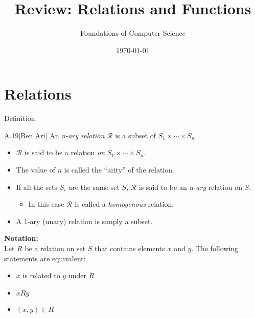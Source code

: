 \documentclass[style=sailor,size=12pt]{powerdot}
\title{Review: Relations and Functions}
\author{Foundations of Computer Science}
\date{\today}
\begin{document}
\maketitle
\section[slide=true]{Relations}
\begin{slide}[bm=,toc=]{Definition}
\begin{defn}{A.19}[Ben Ari]
An \emph{n-ary relation} $\mathcal{R}$ is a subset of $S_1 \times \cdots \times
S_n$. 
\begin{itemize}
\item $\mathcal{R}$ is said to be a relation \emph{on} $S_1 \times \cdots \times
S_n$.
\item The value of $n$ is called the ``arity'' of the relation.
\item If all the sets $S_i$ are the same set $S$, $\mathcal{R}$ is said to be
an \emph{n-ary} relation on $S$.
\begin{itemize}
\item In this case $\mathcal{R}$ is called a \emph{homogenous} relation.
\end{itemize}
\item A 1-ary (unary) relation is simply a subset.
\end{itemize}
\end{defn}
\vspace{-3mm}
\textbf{Notation:}~\\
Let $R$ be a relation on set $S$ that contains elements $x$ and $y$. 
The following statements are equivalent: 
\begin{itemize}
\item $x$ is related to $y$ under $R$
\item $xRy$
\item $(x,y) \in R$
\end{itemize}
\end{slide}
\end{document}

